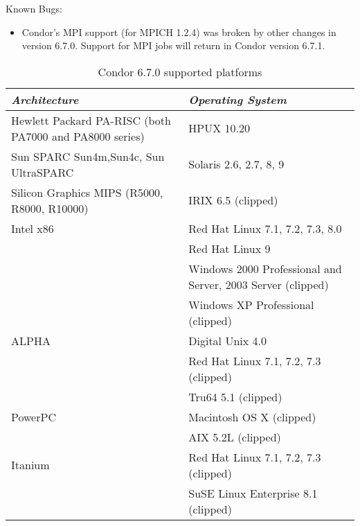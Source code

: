 \noindent Known Bugs:

\begin{itemize}

\item Condor's MPI support (for MPICH 1.2.4) was broken by other
  changes in version 6.7.0.
  Support for MPI jobs will return in Condor version 6.7.1.

\end{itemize}
\begin{center}
\begin{table}[hbt]
\begin{tabular}{|ll|} \hline
\emph{Architecture} & \emph{Operating System} \\ \hline \hline
Hewlett Packard PA-RISC (both PA7000 and PA8000 series) & HPUX 10.20 \\ \hline
Sun SPARC Sun4m,Sun4c, Sun UltraSPARC & Solaris 2.6, 2.7, 8, 9 \\ \hline
Silicon Graphics MIPS (R5000, R8000, R10000) & IRIX 6.5 (clipped) \\ \hline
Intel x86 & Red Hat Linux 7.1, 7.2, 7.3, 8.0 \\
 & Red Hat Linux 9 \\
 & Windows 2000 Professional and Server, 2003 Server (clipped) \\
 & Windows XP Professional (clipped) \\ \hline
ALPHA & Digital Unix 4.0 \\
 & Red Hat Linux 7.1, 7.2, 7.3 (clipped) \\
 & Tru64 5.1 (clipped) \\ \hline
PowerPC & Macintosh OS X (clipped) \\
 & AIX 5.2L (clipped) \\ \hline
Itanium & Red Hat Linux 7.1, 7.2, 7.3 (clipped) \\
 & SuSE Linux Enterprise 8.1 (clipped) \\ \hline
\end{tabular}
\caption{\label{6.7.0-platforms}Condor 6.7.0 supported platforms}
\end{table}
\end{center}
